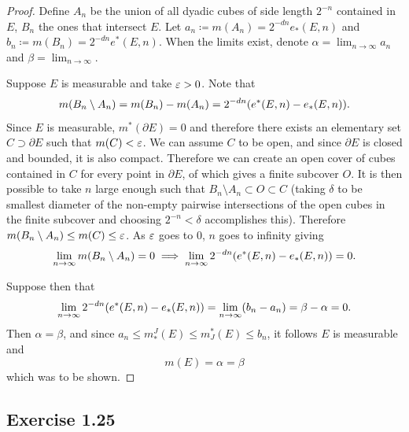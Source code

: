 \documentclass[hw_all.tex]{subfiles}
\begin{document}
\begin{proof}
    Define $A_n$ be the union of all dyadic cubes of side length $2^{-n}$ contained in $E$, $B_n$ the ones that intersect $E$. Let $a_n \coloneq m(A_n) = 2^{-dn} e_*(E, n)$ and $b_n \coloneq m(B_n) = 2^{-dn} e^*(E, n)$. When the limits exist, denote $\alpha = \lim_{n\to \infty} a_n$ and $\beta = \lim_{n \to \infty}$.

    Suppose $E$ is measurable and take $\varepsilon > 0$. Note that
    \[
        m(B_n \setminus A_n) = m(B_n) - m(A_n) = 2^{-dn} \qty(e^*(E, n) - e_*(E, n))
    .\]
    Since $E$ is measurable, $m^*(\partial E) = 0$ and therefore there exists an elementary set $C \supset \partial E$ such that $m(C) < \varepsilon$. We can assume $C$ to be open, and since $\partial E$ is closed and bounded, it is also compact. Therefore we can create an open cover of cubes contained in $C$ for every point in $\partial E$, of which gives a finite subcover $O$. It is then possible to take $n$ large enough such that $B_n \setminus A_n \subset O \subset C$ (taking $\delta$ to be smallest diameter of the non-empty pairwise intersections of the open cubes in the finite subcover and choosing $2^{-n} < \delta$ accomplishes this). Therefore $m(B_n \setminus A_n) \leq m(C) \leq \varepsilon$. As $\varepsilon$ goes to $0$, $n$ goes to infinity giving
    \[
        \lim_{n \to \infty} m(B_n \setminus A_n) = 0 \implies \lim_{n \to \infty} 2^{-dn} \qty(e^*(E, n) - e_*(E, n)) = 0
    .\]

    \noindent
    Suppose then that
    \[
        \lim_{n \to \infty} 2^{-dn} \qty(e^*(E, n) - e_*(E, n)) = \lim_{n \to \infty} (b_n - a_n) = \beta - \alpha = 0
    .\]
    Then $\alpha = \beta$, and since $a_n \leq m^J_*(E) \leq m_J^*(E) \leq b_n$, it follows $E$ is measurable and
    \[
        m(E) = \alpha = \beta
    \]
    which was to be shown.
\end{proof}

\subsection{Exercise 1.25}
\end{document}
